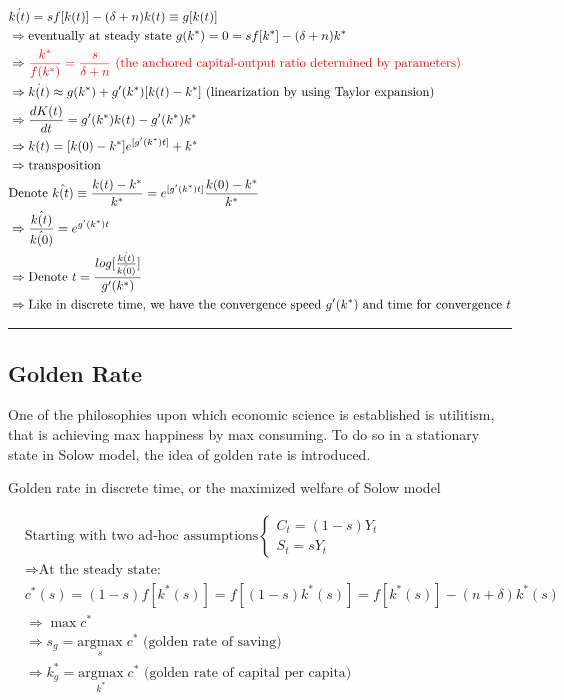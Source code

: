 \documentclass{article}
\newcommand*\sepline{%
  \begin{center}
    \rule[1ex]{.5\textwidth}{.5pt}
  \end{center}}
\begin{document}
\begin{align}
&\dot{k(t)}=sf[k(t)]-(\delta+n)k(t)\equiv g[k(t)]
\\&\Rightarrow \text{eventually at steady state }g(k^{*})=0=sf[k^{*}]-(\delta+n)k^{*} 
\\& \Rightarrow \color{red} \frac{k^{*}}{f(k^{*})}=\frac{s}{\delta+n} \text{ (the anchored capital-output ratio determined by parameters)}
\\& \Rightarrow \dot{k(t)} \approx g(k^{*})+g'(k^{*})[k(t)-k^{*}] \text{ (linearization by using Taylor expansion)}
\\&\Rightarrow \frac{dK(t)}{dt}=g'(k^{*})k(t)-g'(k^{*})k^{*}
\\&\Rightarrow k(t)=[k(0)-k^{*}] e^{[g'(k^{*})t]}+k^{*}
\\&\Rightarrow \text{transposition}
\\&\text{Denote }\hat{k(t)} \equiv \frac{k(t)-k^{*}}{k^{*}}=e^{[g'(k^{*})t]}\frac{k(0)-k^{*}}{k^{*}}
\\&\Rightarrow \frac{\hat{k(t)}}{\hat{k(0)}}=e^{g'(k^{*})t}
\\&\Rightarrow \text{Denote }t=\frac{log[\frac{\hat{k(t)}}{\hat{k(0)}}]}{g'(k^{*})}
\\&\Rightarrow \text{Like in discrete time, we have the convergence speed } g'(k^{*}) \text{ and time for convergence } t
\end{align}

\sepline
\subsection{Golden Rate}\label{golden-rate}

One of the philosophies upon which economic science is established is utilitism, that is achieving max happiness by max consuming. To do so in a stationary state in Solow model, the idea of golden rate is introduced.

Golden rate in discrete time, or the maximized welfare of Solow model 

\begin{align}
& \text{Starting with two ad-hoc assumptions}
\begin{cases}C_{t}=(1-s)Y_{t} \\
S_{t}=sY_{t} 
\end{cases}
\\&\Rightarrow\text{At the steady state:}
\\&c^{*}(s)=(1-s)f[k^{*}(s)]=f[(1-s)k^{*}(s)]=f[k^{*}(s)]-(n+\delta)k^{*}(s)
\\&\Rightarrow \max c^{*}
\\& \Rightarrow s_g=\underset{s}{\text{argmax}}\;c^* \text{ (golden rate of saving)}
\\& \Rightarrow k^*_g=\underset{k^*}{\text{argmax}}\;c^* \text{ (golden rate of capital per capita)}
\end{align}
\end{document}
